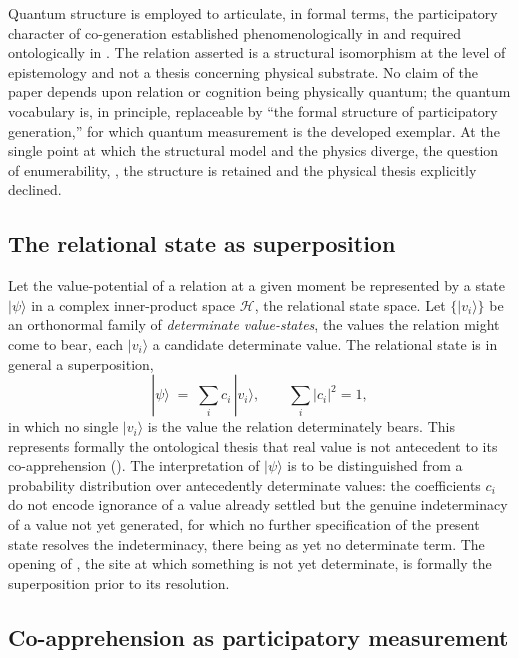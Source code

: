 \begin{claim}
Quantum structure is employed to articulate, in formal terms, the participatory character of co-generation established phenomenologically in  and required ontologically in . The relation asserted is a structural isomorphism at the level of epistemology and not a thesis concerning physical substrate. No claim of the paper depends upon relation or cognition being physically quantum; the quantum vocabulary is, in principle, replaceable by ``the formal structure of participatory generation,'' for which quantum measurement is the developed exemplar. At the single point at which the structural model and the physics diverge, the question of enumerability, , the structure is retained and the physical thesis explicitly declined.
\end{claim}

\subsection{The relational state as superposition}
\label{p10:sec:state}

Let the value-potential of a relation at a given moment be represented by a state $|\psi\rangle$ in a complex inner-product space $\mathcal{H}$, the relational state space. Let $\{|v_i\rangle\}$ be an orthonormal family of \emph{determinate value-states}, the values the relation might come to bear, each $|v_i\rangle$ a candidate determinate value. The relational state is in general a superposition,
\[
|\psi\rangle \;=\; \sum_i c_i\,|v_i\rangle, \qquad \sum_i |c_i|^2 = 1,
\]
in which no single $|v_i\rangle$ is the value the relation determinately bears. This represents formally the ontological thesis that real value is not antecedent to its co-apprehension (). The interpretation of $|\psi\rangle$ is to be distinguished from a probability distribution over antecedently determinate values: the coefficients $c_i$ do not encode ignorance of a value already settled but the genuine indeterminacy of a value not yet generated, for which no further specification of the present state resolves the indeterminacy, there being as yet no determinate term. The opening of , the site at which something is not yet determinate, is formally the superposition prior to its resolution.

\subsection{Co-apprehension as participatory measurement}
\label{p10:sec:measurement}

